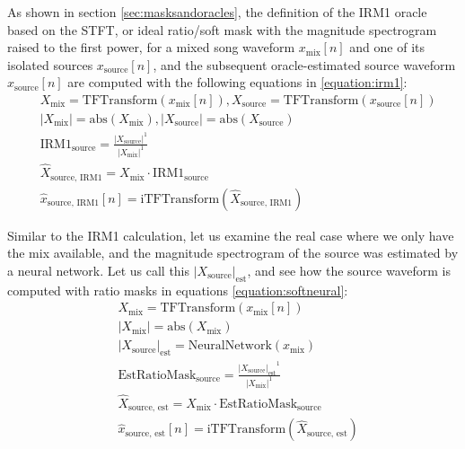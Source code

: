 \documentclass[report.tex]{subfiles}
\begin{document}
As shown in section \ref{sec:masksandoracles}, the definition of the IRM1 oracle based on the STFT, or ideal ratio/soft mask with the magnitude spectrogram raised to the first power, for a mixed song waveform $x_{\text{mix}}[n]$ and one of its isolated sources $x_{\text{source}}[n]$, and the subsequent oracle-estimated source waveform $\hat{x}_{\text{source}}[n]$ are computed with the following equations in \eqref{equation:irm1}:
\begin{align}\tag{1}\label{equation:irm1}
	\nonumber & X_{\text{mix}} = \text{TFTransform}(x_{\text{mix}}[n]), X_{\text{source}} = \text{TFTransform}(x_{\text{source}}[n])\\
	\nonumber & |X_{\text{mix}}| = \text{abs}(X_{\text{mix}}), |X_{\text{source}}| = \text{abs}(X_{\text{source}})\\
	\nonumber & \text{IRM1}_{\text{source}} = \frac{|X_{\text{source}}|^{1}}{|X_{\text{mix}}|^{1}}\\
	\nonumber & \hat{X}_{\text{source, IRM1}} = X_{\text{mix}} \cdot \text{IRM1}_{\text{source}}\\
	\nonumber & \hat{x}_{\text{source, IRM1}}[n] = \text{iTFTransform}(\hat{X}_{\text{source, IRM1}})
\end{align}

Similar to the IRM1 calculation, let us examine the real case where we only have the mix available, and the magnitude spectrogram of the source was estimated by a neural network. Let us call this $|X_{\text{source}}|_{\text{est}}$, and see how the source waveform is computed with ratio masks in equations \eqref{equation:softneural}:
\begin{align}\tag{2}\label{equation:softneural}
	\nonumber & X_{\text{mix}} = \text{TFTransform}(x_{\text{mix}}[n])\\
	\nonumber & |X_{\text{mix}}| = \text{abs}(X_{\text{mix}})\\
	\nonumber & {|X_{\text{source}}|}_{\text{est}} = \text{NeuralNetwork}(x_{\text{mix}})\\
	\nonumber & \text{EstRatioMask}_{\text{source}} = \frac{{|X_{\text{source}}|_{\text{est}}}^{1}}{|X_{\text{mix}}|^{1}}\\
	\nonumber & \hat{X}_{\text{source, est}} = X_{\text{mix}} \cdot \text{EstRatioMask}_{\text{source}}\\
	\nonumber & \hat{x}_{\text{source, est}}[n] = \text{iTFTransform}(\hat{X}_{\text{source, est}})
\end{align}
\end{document}
